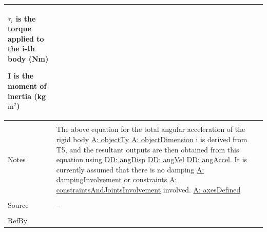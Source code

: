 \documentclass[12pt]{article}
\begin{document}
\begin{minipage}{\textwidth}
\begin{tabular}{p{} p{}}
\begin{symbDescription}
              \item{${τ_{i}}$ is the torque applied to the i-th body (Nm)}
              \item{$\mathbf{I}$ is the moment of inertia (kg$\text{m}^{2}$)}
              \end{symbDescription}
\\ \midrule \\
Notes & The above equation for the total angular acceleration of the rigid body \hyperref[assumpOT]{A: objectTy} \hyperref[assumpOD]{A: objectDimension} i is derived from T5, and the resultant outputs are then obtained from this equation using \hyperref[DD:angDisp]{DD: angDisp} \hyperref[DD:angVel]{DD: angVel} \hyperref[DD:angAccel]{DD: angAccel}. It is currently assumed that there is no damping \hyperref[assumpDI]{A: dampingInvolvement} or constraints \hyperref[assumpCAJI]{A: constraintsAndJointsInvolvement} involved. \hyperref[assumpAD]{A: axesDefined}
\\ \midrule \\
Source & --
\\ \midrule \\
RefBy & 
\\ \bottomrule \end{tabular}
\end{minipage}
\par~
\end{document}
